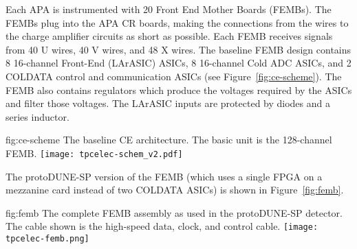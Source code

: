 
Each APA is instrumented with 20 Front End Mother Boards (FEMBs).
The FEMBs plug into the APA CR boards, making the connections from the wires to the charge amplifier circuits as short as possible.
Each FEMB receives signals from 40 U wires, 40 V wires, and 48 X wires.
The baseline FEMB design contains 8 16-channel Front-End (LArASIC) ASICs, 8 16-channel Cold ADC ASICs, and 2 COLDATA control and communication ASICs (see Figure~\ref{fig:ce-scheme}).
The FEMB also contains regulators which produce the voltages required by the ASICs and filter those voltages.
The LArASIC inputs are protected by diodes and a series inductor.
 
\begin{dunefigure}
{fig:ce-scheme}
{The baseline CE architecture. The basic unit is the 128-channel FEMB.}
\texttt{[image: tpcelec-schem\_v2.pdf]}
\end{dunefigure}

The protoDUNE-SP version of the FEMB (which uses a single FPGA on a mezzanine card instead of two COLDATA ASICs) is shown in Figure~\ref{fig:femb}.

\begin{dunefigure}
{fig:femb}
{The complete FEMB assembly as used in the protoDUNE-SP detector. The cable shown is the high-speed data, clock, and control cable.}
\texttt{[image: tpcelec-femb.png]}
\end{dunefigure}
